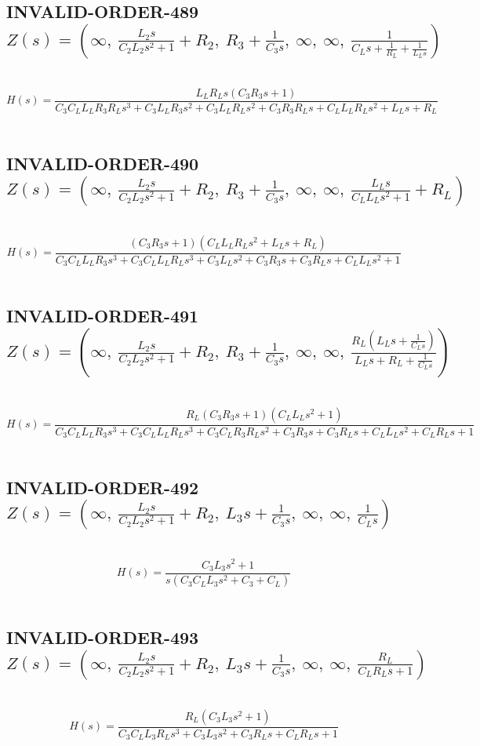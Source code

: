 \documentclass{article}
\begin{document}
\subsection{INVALID-ORDER-489 $Z(s) = \left( \infty, \  \frac{L_{2} s}{C_{2} L_{2} s^{2} + 1} + R_{2}, \  R_{3} + \frac{1}{C_{3} s}, \  \infty, \  \infty, \  \frac{1}{C_{L} s + \frac{1}{R_{L}} + \frac{1}{L_{L} s}}\right)$ } \ 
\textbf{\[H(s) = \frac{L_{L} R_{L} s \left(C_{3} R_{3} s + 1\right)}{C_{3} C_{L} L_{L} R_{3} R_{L} s^{3} + C_{3} L_{L} R_{3} s^{2} + C_{3} L_{L} R_{L} s^{2} + C_{3} R_{3} R_{L} s + C_{L} L_{L} R_{L} s^{2} + L_{L} s + R_{L}}\] } \ 
\subsection{INVALID-ORDER-490 $Z(s) = \left( \infty, \  \frac{L_{2} s}{C_{2} L_{2} s^{2} + 1} + R_{2}, \  R_{3} + \frac{1}{C_{3} s}, \  \infty, \  \infty, \  \frac{L_{L} s}{C_{L} L_{L} s^{2} + 1} + R_{L}\right)$ } \ 
\textbf{\[H(s) = \frac{\left(C_{3} R_{3} s + 1\right) \left(C_{L} L_{L} R_{L} s^{2} + L_{L} s + R_{L}\right)}{C_{3} C_{L} L_{L} R_{3} s^{3} + C_{3} C_{L} L_{L} R_{L} s^{3} + C_{3} L_{L} s^{2} + C_{3} R_{3} s + C_{3} R_{L} s + C_{L} L_{L} s^{2} + 1}\] } \ 
\subsection{INVALID-ORDER-491 $Z(s) = \left( \infty, \  \frac{L_{2} s}{C_{2} L_{2} s^{2} + 1} + R_{2}, \  R_{3} + \frac{1}{C_{3} s}, \  \infty, \  \infty, \  \frac{R_{L} \left(L_{L} s + \frac{1}{C_{L} s}\right)}{L_{L} s + R_{L} + \frac{1}{C_{L} s}}\right)$ } \ 
\textbf{\[H(s) = \frac{R_{L} \left(C_{3} R_{3} s + 1\right) \left(C_{L} L_{L} s^{2} + 1\right)}{C_{3} C_{L} L_{L} R_{3} s^{3} + C_{3} C_{L} L_{L} R_{L} s^{3} + C_{3} C_{L} R_{3} R_{L} s^{2} + C_{3} R_{3} s + C_{3} R_{L} s + C_{L} L_{L} s^{2} + C_{L} R_{L} s + 1}\] } \ 
\subsection{INVALID-ORDER-492 $Z(s) = \left( \infty, \  \frac{L_{2} s}{C_{2} L_{2} s^{2} + 1} + R_{2}, \  L_{3} s + \frac{1}{C_{3} s}, \  \infty, \  \infty, \  \frac{1}{C_{L} s}\right)$ } \ 
\textbf{\[H(s) = \frac{C_{3} L_{3} s^{2} + 1}{s \left(C_{3} C_{L} L_{3} s^{2} + C_{3} + C_{L}\right)}\] } \ 
\subsection{INVALID-ORDER-493 $Z(s) = \left( \infty, \  \frac{L_{2} s}{C_{2} L_{2} s^{2} + 1} + R_{2}, \  L_{3} s + \frac{1}{C_{3} s}, \  \infty, \  \infty, \  \frac{R_{L}}{C_{L} R_{L} s + 1}\right)$ } \ 
\textbf{\[H(s) = \frac{R_{L} \left(C_{3} L_{3} s^{2} + 1\right)}{C_{3} C_{L} L_{3} R_{L} s^{3} + C_{3} L_{3} s^{2} + C_{3} R_{L} s + C_{L} R_{L} s + 1}\] } \ 
\end{document}
